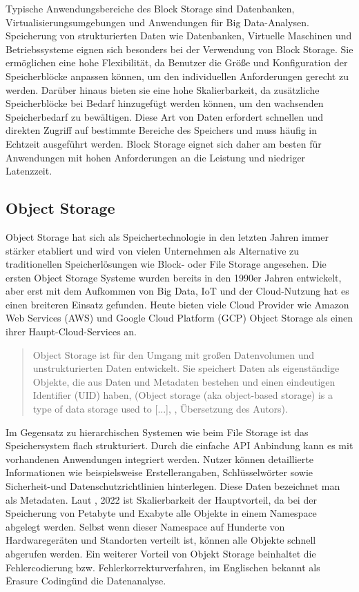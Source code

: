 Typische Anwendungsbereiche des Block Storage sind Datenbanken, Virtualisierungsumgebungen und Anwendungen für Big Data-Analysen. Speicherung von strukturierten Daten wie Datenbanken, Virtuelle Maschinen und Betriebssysteme eignen sich besonders bei der Verwendung von Block Storage. Sie ermöglichen eine hohe Flexibilität, da Benutzer die Größe und Konfiguration der Speicherblöcke anpassen können, um den individuellen Anforderungen gerecht zu werden. Darüber hinaus bieten sie eine hohe Skalierbarkeit, da zusätzliche Speicherblöcke bei Bedarf hinzugefügt werden können, um den wachsenden Speicherbedarf zu bewältigen. Diese Art von Daten erfordert schnellen und direkten Zugriff auf bestimmte Bereiche des Speichers und muss häufig in Echtzeit ausgeführt werden. Block Storage eignet sich daher am besten für Anwendungen mit hohen Anforderungen an die Leistung und niedriger Latenzzeit.

\newpage

\subsection{Object Storage}

Object Storage hat sich als Speichertechnologie in den letzten Jahren immer stärker etabliert und wird von vielen Unternehmen als Alternative zu traditionellen Speicherlösungen wie Block- oder File Storage angesehen. Die ersten Object Storage Systeme wurden bereits in den 1990er Jahren entwickelt, aber erst mit dem Aufkommen von Big Data, IoT und der Cloud-Nutzung 
 hat es einen breiteren Einsatz gefunden. Heute bieten viele Cloud Provider wie Amazon Web Services (AWS) und Google Cloud Platform (GCP) Object Storage als einen ihrer Haupt-Cloud-Services an.
 
\begin{quote}
	Object Storage ist für den Umgang mit großen Datenvolumen und unstrukturierten Daten entwickelt. Sie speichert Daten als eigenständige Objekte, die aus Daten und Metadaten bestehen und einen eindeutigen Identifier (UID) haben, (\glqq Object storage (aka object-based storage) is a type of data storage used to [...]\grqq, \cite{dataCore-OS}, Übersetzung des Autors).
\end{quote}

Im Gegensatz zu hierarchischen Systemen wie beim File Storage ist das Speichersystem flach strukturiert. Durch die einfache API Anbindung kann es mit vorhandenen Anwendungen integriert werden. Nutzer können detaillierte Informationen wie beispielsweise Erstellerangaben, Schlüsselwörter sowie Sicherheit-und Datenschutzrichtlinien hinterlegen. Diese Daten bezeichnet man als Metadaten. Laut \citeauthor{nx-fileScala}, 2022 ist Skalierbarkeit der Hauptvorteil, da bei der Speicherung von Petabyte und Exabyte alle Objekte in einem Namespace abgelegt werden. Selbst wenn dieser Namespace auf Hunderte von Hardwaregeräten und Standorten verteilt ist, können alle Objekte schnell abgerufen werden. Ein weiterer Vorteil von Objekt Storage beinhaltet die Fehlercodierung bzw. Fehlerkorrekturverfahren, im Englischen bekannt als \"Erasure Coding\" und die Datenanalyse.\\

